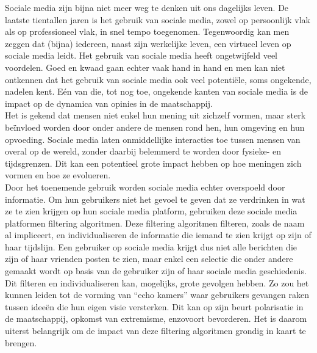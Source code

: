 \documentclass[11 pt , letterpaper , twoside , openright]{book}
\newenvironment{abstract}%
{\cleardoublepage\null \vfill\begin{center}\bfseries \abstractname \end{center}}{\vfill\null}
\begin{document}

\begin{abstract}
\thispagestyle{plain}
\setcounter{page}{\value{abstractpage}}

\noindent
Sociale media zijn bijna niet meer weg te denken uit ons dagelijks leven. De laatste tientallen jaren is het gebruik van sociale media, zowel op persoonlijk vlak als op professioneel vlak, in snel tempo toegenomen. Tegenwoordig kan men zeggen dat (bijna) iedereen, naast zijn werkelijke leven, een virtueel leven op sociale media leidt. Het gebruik van sociale media heeft ongetwijfeld veel voordelen. Goed en kwaad gaan echter vaak hand in hand en men kan niet ontkennen dat het gebruik van sociale media ook veel potentiële, soms ongekende, nadelen kent. Eén van die, tot nog toe, ongekende kanten van sociale media is de impact op de dynamica van opinies in de maatschappij. \\
\newline
Het is gekend dat mensen niet enkel hun mening uit zichzelf vormen, maar sterk beïnvloed worden door onder andere de mensen rond hen, hun omgeving en hun opvoeding. Sociale media laten onmiddellijke interacties toe tussen mensen van overal op de wereld, zonder daarbij belemmerd te worden door fysieke- en tijdsgrenzen. Dit kan een potentieel grote impact hebben op hoe meningen zich vormen en hoe ze evolueren.\\
\newline
Door het toenemende gebruik worden sociale media echter overspoeld door informatie. Om hun gebruikers niet het gevoel te geven dat ze verdrinken in wat ze te zien krijgen op hun sociale media platform, gebruiken deze sociale media platformen filtering algoritmen. Deze filtering algoritmen filteren, zoals de naam al impliceert, en individualiseren de informatie die iemand te zien krijgt op zijn of haar tijdslijn. Een gebruiker op sociale media krijgt dus niet alle berichten die zijn of haar vrienden posten te zien, maar enkel een selectie die onder andere gemaakt wordt op basis van de gebruiker zijn of haar sociale media geschiedenis. Dit filteren en individualiseren kan, mogelijks, grote gevolgen hebben. Zo zou het kunnen leiden tot de vorming van ``echo kamers'' waar gebruikers gevangen raken tussen ideeën die hun eigen visie versterken. Dit kan op zijn beurt polarisatie in de maatschappij, opkomst van extremisme, enzovoort bevorderen. Het is daarom uiterst belangrijk om de impact van deze filtering algoritmen grondig in kaart te brengen.\\

\end{abstract}
\end{document}
